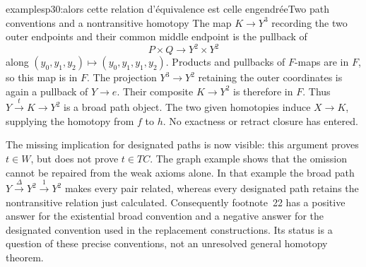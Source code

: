 \begin{dcomment}{examples}{p30:alors cette relation d'équivalence est celle engendrée}{Two path conventions and a nontransitive homotopy}
The map $K\to Y^3$ recording the two outer endpoints and their common middle endpoint is the pullback of
\[
 P\times Q\longrightarrow Y^2\times Y^2
\]
along $(y_0,y_1,y_2)\mapsto(y_0,y_1,y_1,y_2)$. Products and pullbacks of $F$-maps are in $F$, so this map is in $F$. The projection $Y^3\to Y^2$ retaining the outer coordinates is again a pullback of $Y\to e$. Their composite $K\to Y^2$ is therefore in $F$. Thus $Y\xrightarrow{t}K\to Y^2$ is a broad path object. The two given homotopies induce $X\to K$, supplying the homotopy from $f$ to $h$. No exactness or retract closure has entered.

The missing implication for designated paths is now visible: this argument proves $t\in W$, but does not prove $t\in TC$. The graph example shows that the omission cannot be repaired from the weak axioms alone. In that example the broad path $Y\xrightarrow{\Delta}Y^2\xrightarrow{1}Y^2$ makes every pair related, whereas every designated path retains the nontransitive relation just calculated. Consequently footnote~22 has a positive answer for the existential broad convention and a negative answer for the designated convention used in the replacement constructions. Its status is a question of these precise conventions, not an unresolved general homotopy theorem.
\end{dcomment}

